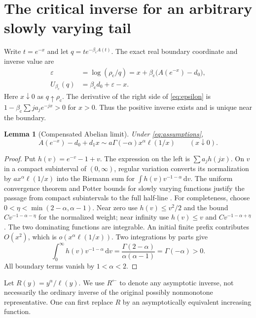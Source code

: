 \documentclass[11pt,a4paper]{article}
\numberwithin{equation}{section}
\newtheorem{lemma}[theorem]{Lemma}
\theoremstyle{definition}\newtheorem{definition}[theorem]{Definition}
\theoremstyle{remark}\newtheorem{remark}[theorem]{Remark}
\theoremstyle{definition}
\newcommand{\bc}{\beta_{\mathrm c}}\newcommand{\rhoc}{\rho_{\mathrm c}}
\newcommand{\dd}{\,\mathrm d}
\newcommand{\asyminv}{\leftarrow}
\begin{document}
\section{The critical inverse for an arbitrary slowly varying tail}
\label{sec:inverse-rv}

Write $t=e^{-x}$ and let $q=t e^{-\bc A(t)}$. The exact real boundary
coordinate and inverse value are
\begin{align}
 \varepsilon&=\log(\rhoc/q)
       =x+\bc\bigl(A(e^{-x})-d_0\bigr),\label{eq:epsilon}\\
 U_{\bc}(q)&=\bc d_0+\varepsilon-x.\label{eq:Uinverse}
\end{align}
Here $x\downarrow0$ as $q\uparrow\rhoc$. The derivative of the right side
of \eqref{eq:epsilon} is
$1-\bc\sum j a_j e^{-jx}>0$ for $x>0$. Thus the positive inverse exists
and is unique near the boundary.

\begin{lemma}[Compensated Abelian limit]\label{lem:abelian}
Under \eqref{eq:assumptions},
\begin{equation}\label{eq:abelian}
 A(e^{-x})-d_0+d_1x
 \sim a\Gamma(-\alpha)x^\alpha\ell(1/x)
 \qquad(x\downarrow0).
\end{equation}
\end{lemma}
\begin{proof}
Put $h(v)=e^{-v}-1+v$. The expression on the left is
$\sum a_jh(jx)$. On $v$ in a compact subinterval of $(0,\infty)$,
regular variation converts its normalization by
$a x^\alpha\ell(1/x)$ into the Riemann sum for
$\int h(v)v^{-1-\alpha}\dd v$. The uniform convergence theorem and Potter
bounds for slowly varying functions justify the passage from compact
subintervals to the full half-line \cite{bgt}. For completeness, choose
$0<\eta<\min(2-\alpha,\alpha-1)$. Near zero use $h(v)\le v^2/2$ and the
bound $C v^{-1-\alpha-\eta}$ for the normalized weight; near infinity use
$h(v)\le v$ and $C v^{-1-\alpha+\eta}$. The two dominating functions are
integrable. An initial finite prefix contributes $O(x^2)$, which is
$o(x^\alpha\ell(1/x))$. Two integrations by parts give
\[
 \int_0^\infty h(v)v^{-1-\alpha}\dd v
 =\frac{\Gamma(2-\alpha)}{\alpha(\alpha-1)}
 =\Gamma(-\alpha)>0.
\]
All boundary terms vanish by $1<\alpha<2$.
\end{proof}

Let $R(y)=y^\alpha/\ell(y)$. We use $R^\asyminv$ to denote any asymptotic
inverse, not necessarily the ordinary inverse of the original possibly
nonmonotone representative. One can first replace $R$ by an asymptotically
equivalent increasing function.
\end{document}
